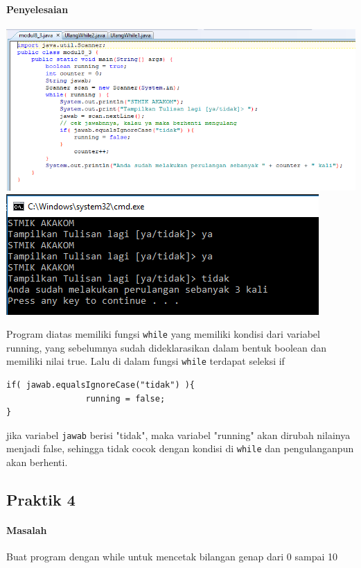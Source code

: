 \documentclass[a4paper,12pt]{article}
\begin{document}
\paragraph{Penyelesaian\\}
\begin{center}
	\includegraphics[scale=.7]{Capture6}
	\includegraphics[scale=1]{Capture7}
\end{center}
Program diatas memiliki fungsi \texttt{while} yang memiliki kondisi dari variabel running, yang sebelumnya sudah dideklarasikan dalam bentuk boolean dan memiliki nilai true. Lalu di dalam fungsi \texttt{while} terdapat seleksi if
\begin{lstlisting}[frame=single]
if( jawab.equalsIgnoreCase("tidak") ){
                running = false;
}
\end{lstlisting}
jika variabel \texttt{jawab} berisi "tidak", maka variabel "running" akan dirubah nilainya menjadi false, sehingga tidak cocok dengan kondisi di \texttt{while} dan pengulanganpun akan berhenti.

\subsection{Praktik 4}
\paragraph{Masalah\\}
Buat program dengan while untuk mencetak bilangan genap dari 0 sampai 10
\end{document}
